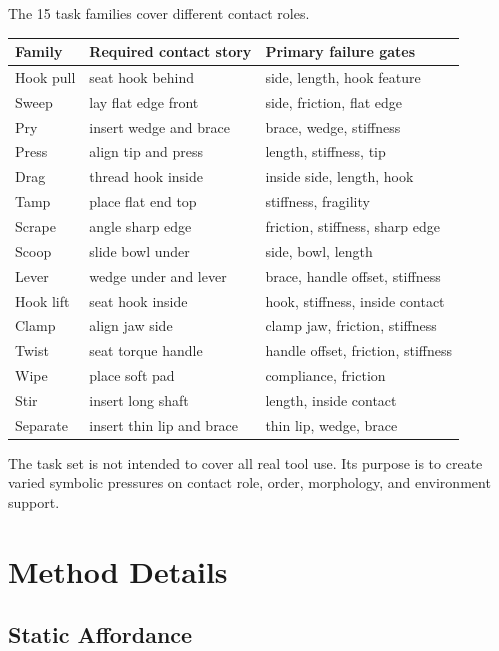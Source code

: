 \documentclass{article}
\begin{document}
The 15 task families cover different contact roles.
\begin{center}
\small
\begin{tabular}{lll}
\toprule
Family & Required contact story & Primary failure gates \\
\midrule
Hook pull & seat hook behind & side, length, hook feature \\
Sweep & lay flat edge front & side, friction, flat edge \\
Pry & insert wedge and brace & brace, wedge, stiffness \\
Press & align tip and press & length, stiffness, tip \\
Drag & thread hook inside & inside side, length, hook \\
Tamp & place flat end top & stiffness, fragility \\
Scrape & angle sharp edge & friction, stiffness, sharp edge \\
Scoop & slide bowl under & side, bowl, length \\
Lever & wedge under and lever & brace, handle offset, stiffness \\
Hook lift & seat hook inside & hook, stiffness, inside contact \\
Clamp & align jaw side & clamp jaw, friction, stiffness \\
Twist & seat torque handle & handle offset, friction, stiffness \\
Wipe & place soft pad & compliance, friction \\
Stir & insert long shaft & length, inside contact \\
Separate & insert thin lip and brace & thin lip, wedge, brace \\
\bottomrule
\end{tabular}
\end{center}

The task set is not intended to cover all real tool use. Its purpose is to create varied symbolic pressures on contact role, order, morphology, and environment support.

\section{Method Details}

\subsection{Static Affordance}
\end{document}
